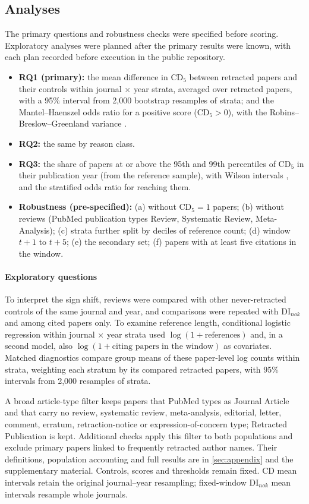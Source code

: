 \subsection{Analyses}
The primary questions and robustness checks were specified before scoring. Exploratory analyses were planned after
the primary results were known, with each plan recorded before execution in the public repository.
\begin{itemize}
\item \textbf{RQ1 (primary):} the mean difference in CD$_5$ between retracted papers and their controls within
journal $\times$ year strata, averaged over retracted papers, with a 95\% interval from 2,000 bootstrap resamples of
strata; and the Mantel--Haenszel odds ratio \citep{mantel1959} for a positive score (CD$_5 > 0$), with the
Robins--Breslow--Greenland variance \citep{robins1986estimator}.
\item \textbf{RQ2:} the same by reason class.
\item \textbf{RQ3:} the share of papers at or above the 95th and 99th percentiles of CD$_5$ in their publication year
(from the reference sample), with Wilson intervals \citep{wilson1927}, and the stratified odds ratio for reaching them.
\item \textbf{Robustness (pre-specified):} (a) without CD$_5 = 1$ papers; (b) without reviews (PubMed publication
types Review, Systematic Review, Meta-Analysis); (c) strata further split by deciles of reference count; (d) window
$t+1$ to $t+5$; (e) the secondary set; (f) papers with at least five citations in the window.
\end{itemize}

\paragraph{Exploratory questions}
To interpret the sign shift, reviews were compared with other never-retracted controls of the same journal and year,
and comparisons were repeated with DI$_{nok}$ and among cited papers only.
To examine reference length, conditional logistic regression within journal $\times$ year strata used
$\log(1+\text{references})$ and, in a second model, also $\log(1+\text{citing papers in the window})$ as covariates.
Matched diagnostics compare group means of these paper-level log counts within strata, weighting each
stratum by its compared retracted papers, with 95\% intervals from 2,000 resamples of strata.

A broad article-type filter keeps papers that PubMed types as Journal Article and that carry no review,
systematic review, meta-analysis, editorial, letter, comment, erratum, retraction-notice or expression-of-concern
type; Retracted Publication is kept. Additional checks apply this filter to both populations and exclude primary
papers linked to frequently retracted author names. Their definitions, population accounting and full results are in
\ref{sec:appendix} and the supplementary material. Controls, scores and thresholds remain fixed. CD mean intervals retain the original
journal--year resampling; fixed-window DI$_{nok}$ mean intervals resample whole journals.


